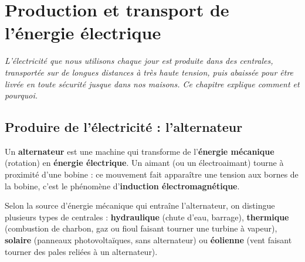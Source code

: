 \chapter{Production et transport de l'énergie électrique}

\noindent\textit{L'électricité que nous utilisons chaque jour est produite dans des
centrales, transportée sur de longues distances à très haute tension, puis abaissée pour
être livrée en toute sécurité jusque dans nos maisons. Ce chapitre explique comment et
pourquoi.}
\vspace{8pt}

\connecteBanner

\section{Produire de l'électricité : l'alternateur}

\begin{definition}[Alternateur]
Un \textbf{alternateur} est une machine qui transforme de l'\textbf{énergie mécanique}
(rotation) en \textbf{énergie électrique}. Un aimant (ou un électroaimant) tourne à
proximité d'une bobine : ce mouvement fait apparaître une tension aux bornes de la bobine,
c'est le phénomène d'\textbf{induction électromagnétique}.
\end{definition}

\begin{propriete}
Selon la source d'énergie mécanique qui entraîne l'alternateur, on distingue plusieurs
types de centrales : \textbf{hydraulique} (chute d'eau, barrage), \textbf{thermique}
(combustion de charbon, gaz ou fioul faisant tourner une turbine à vapeur), \textbf{solaire}
(panneaux photovoltaïques, sans alternateur) ou \textbf{éolienne} (vent faisant tourner des
pales reliées à un alternateur).
\end{propriete}

\begin{illus}
\end{illus}

